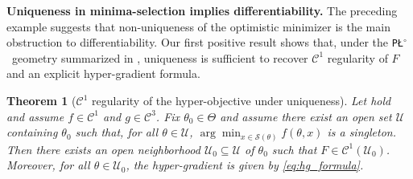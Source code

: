 \documentclass{article}
\theoremstyle{normaltheorem}
\newtheorem{theorem}{Theorem}[section]
\newcommand{\PLcirc}{\texttt{P\L$^\circ$}}
\newcommand{\calS}{\mathcal{S}}
\newcommand{\minimaselection}{{minima-selection}\xspace}
\begin{document}
\textbf{Uniqueness in \minimaselection implies differentiability.}
The preceding example suggests that non-uniqueness of the optimistic minimizer is the main obstruction to differentiability. Our first positive result shows that, under the \PLcirc\ geometry summarized in , uniqueness is sufficient to recover $\mathcal C^1$ regularity of $F$ and an explicit hyper-gradient formula.%


\begin{theorem}[$\mathcal C^1$ regularity of the hyper-objective under uniqueness]\label{thm:F-diff-unique}
Let  hold and assume $f \in \mathcal C^1$ and $g \in \mathcal C^3$.
Fix $\theta_0\in\Theta$ and assume there exist an open set $\mathcal U$ containing $\theta_0$ such that, for all $\theta\in\mathcal U$, \(\arg\min_{x\in\calS(\theta)} f(\theta,x)\) is a singleton.
Then there exists an open neighborhood $\mathcal U_0\subseteq\mathcal U$ of $\theta_0$ such that $F \in \mathcal{C}^1(\mathcal U_0)$.
Moreover, for all $\theta\in\mathcal U_0$, the hyper-gradient is given by \cref{eq:hg_formula}.
\end{theorem}
\end{document}

